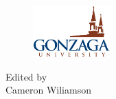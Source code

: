 \begin{titlepage}
  \vfill 
  
  
  \begin{figure}[!h]
      \centering
      \includegraphics[width = 3cm]{resource/images/Gonzaga_University_Logo.jpg}%
  \end{figure}
  \vspace{0.3\baselineskip} 
  
  
  {\large Edited by\\  Cameron Wiliamson}
  \end{titlepage}